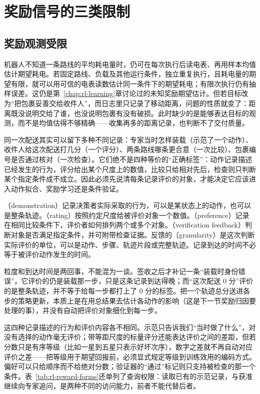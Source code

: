 \section{奖励信号的三类限制}
\label{sec:rl-reward-limits}

\subsection{奖励观测受限}
\label{sec:rl-reward-observation}

机器人不知道一条路线的平均耗电量时，仍可在每次执行后读电表、再用样本均值估计期望耗电。若固定路线、负载及其他运行条件，独立重复执行，且耗电量的期望有限，就可以用可信的电表读数估计同一条件下的期望耗电；有限次执行仍有抽样误差。这仍是第~\ref{chap:rl-learning}章讨论过的未知奖励期望估计。但若目标改为“把包裹妥善交给收件人”，而日志里只记录了移动距离，问题的性质就变了：距离既没说明交给了谁，也没说明包裹有没有破损。此时缺少的是能够表达目标的观测，而不是均值估得不够精确——收集再多的距离记录，也判断不了交付质量。

同一次配送其实可以留下多种不同记录：专家当时怎样装载（示范了一个动作）、收件人给这次配送打几分（一个评分）、两条路线哪条更合意（一次比较）、包裹编号是否通过核对（一次检查）。它们绝不是四种等价的“正确标签”：动作记录描述已经发生的行为，评分给出某个尺度上的数值，比较只给相对先后，检查则只判断某个指定条件成不成立。因此必须先说清每条记录评价的对象，才能决定它应该进入动作拟合、奖励学习还是条件验证。

\begin{definition}[替代反馈的形式与粒度]
  \label{def:rl-reward-feedback}
  （demonstration）记录决策者实际采取的行为，可以是某状态上的动作，也可以是整条轨迹。（rating）按照约定尺度给被评价对象一个数值。（preference）记录在相同比较条件下，评价者如何排列两个或多个对象。（verification feedback）判断对象是否满足指定条件，并可附带检查证据。反馈的（granularity）是这次判断实际评价的单位，可以是动作、步骤、轨迹片段或完整轨迹。记录到达的时间不必等于被评价动作发生的时间。
\end{definition}

粒度和到达时间是两回事，不能混为一谈。签收之后才补记一条“装载时身份错误”，它评价的仍是装载那一步，只是这条记录到达得晚；而“这次配送 0 分”评价的是整条轨迹，并不等于给每一步都打上了 0 分的标签。把一个轨迹总分送进各步的策略更新，本质上是在用总结果去估计各动作的影响（这是下一节奖励归因要处理的事），并没有自动把评价对象细化到每一步。

这四种记录描述的行为和评价内容各不相同。示范只告诉我们“当时做了什么”，对没有选择的动作毫无评价；带等距尺度的标量评分还能表达评价之间的差距，但若分数只是有序等级（比如一星到五星只表示好坏次序），数字之差就不再自动对应评价之差——把等级用于期望回报前，必须显式规定等级到训练效用的编码方式。偏好可以只给顺序而不给绝对分数；验证器的“通过”标记则只支持被检查的那一个条件。表~\ref{tab:rl-reward-forms}还单列了查询权限：读取已有的示范记录，与获准继续向专家追问，是两种不同的访问能力，前者不能代替后者。

